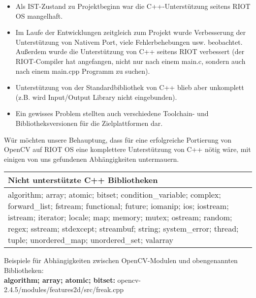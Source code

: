 \documentclass[10pt,a4paper]{article}
\begin{document}
\begin{itemize}
\item Als IST-Zustand zu Projektbeginn war die C++-Unterstützung seitens RIOT OS mangelhaft.
\item Im Laufe der Entwicklungen zeitgleich zum Projekt wurde Verbesserung der Unterstützung von Nativem Port, viele Fehlerbehebungen usw. beobachtet. Außerdem wurde die Unterstützung von C++ seitens RIOT verbessert (der RIOT-Compiler hat angefangen, nicht nur nach einem main.c, sondern auch nach einem main.cpp Programm zu suchen). 
\item Unterstützung von der Standardbibliothek von C++ blieb aber unkomplett (z.B. wird Input/Output Library nicht eingebunden).
\item Ein gewisses Problem stellten auch verschiedene Toolchain- und Bibliotheksversionen für die Zielplattformen dar.
\end{itemize}

Wür möchten unsere Behauptung, dass für eine erfolgreiche Portierung von OpenCV auf RIOT OS eine komplettere Unterstützung von C++ nötig wäre, mit einigen von uns gefundenen Abhängigkeiten untermauern. \newline

\begin{center}
  \begin{tabular}{ | p{10cm} | }
    \hline
    Nicht unterstützte C++ Bibliotheken \\ \hline

algorithm; array; atomic; bitset; condition\_variable; complex; \newline
forward\_list; fstream; functional; future; iomanip; ios; iostream; \newline 
istream; iterator; locale; map; memory; mutex; ostream; random; \newline
regex; sstream; stdexcept; streambuf; string; system\_error; \newline
thread; tuple; unordered\_map; unordered\_set; valarray \\

    \hline
  \end{tabular}
\end{center}

Beispiele für Abhängigkeiten zwischen OpenCV-Modulen und obengenannten Bibliotheken: \\

{\bf algorithm; array; atomic; bitset:} \newline
opencv-2.4.5/modules/features2d/src/freak.cpp \newline
\end{document}
